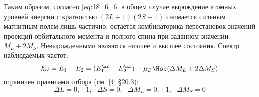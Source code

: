 Таким образом, согласно \eqref{eq:18_6_6} в общем случае вырождение атомных уровней энергии с кратностью $(2L+1)(2S+1)$ снимается сильным магнитным полем лишь частично: остается комбинаторика перестановок значений проекций орбитального момента и полного спина при заданном значении $M_L + 2 M_S$. Невырожденными являются низшее и высшее состояния. Спектр наблюдаемых частот: 
\begin{equation}
\label{eq:18_6_7}
\hbar \omega = E_1 - E_2 = (E_1^\zr -E_2^\zr)  + \mu_B \Hsc (\Delta M_L + 2\Delta M_S)
\end{equation}
ограничен правилами отбора (см. [4] \S 20.3):
$$
\boxed{\Delta L = 0, \pm 1;~~~ \Delta S = 0; ~~~\Delta M_L = 0, \pm 1; ~~~ \Delta M_S = 0}
$$